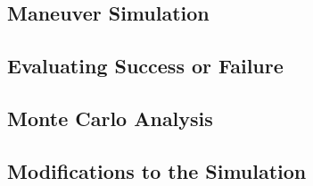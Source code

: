 \subsection{Maneuver Simulation}


\subsection{Evaluating Success or Failure}

\subsection{Monte Carlo Analysis}

\subsection{Modifications to the Simulation}
